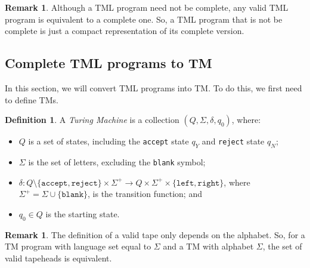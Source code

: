 \documentclass{article}
\theoremstyle{definition}
\newtheorem{definition}[rules]{Definition}
\newtheorem{remark}[rules]{Remark}
\theoremstyle{plain}
\begin{document}
\begin{remark}
    Although a TML program need not be complete, any valid TML program is equivalent to a complete one. So, a TML program that is not be complete is just a compact representation of its complete version.
\end{remark}

\subsection{Complete TML programs to TM}
In this section, we will convert TML programs into TM. To do this, we first need to define TMs.
\begin{definition}
    A \emph{Turing Machine} is a collection $(Q, \Sigma, \delta, q_0)$, where:
    \begin{itemize}
        \item $Q$ is a set of states, including the \texttt{accept} state $q_Y$ and \texttt{reject} state $q_N$;
        \item $\Sigma$ is the set of letters, excluding the \texttt{blank} symbol;
        \item $\delta: Q \setminus \{\texttt{accept}, \texttt{reject}\} \times \Sigma^+ \to Q \times \Sigma^+ \times \{\texttt{left}, \texttt{right}\}$, where $\Sigma^+ = \Sigma \cup \{\texttt{blank}\}$, is the transition function; and
        \item $q_0 \in Q$ is the starting state.
    \end{itemize}
\end{definition}


\begin{remark}
    The definition of a valid tape only depends on the alphabet. So, for a TM program with language set equal to $\Sigma$ and a TM with alphabet $\Sigma$, the set of valid tapeheads is equivalent.
\end{remark}
\end{document}

